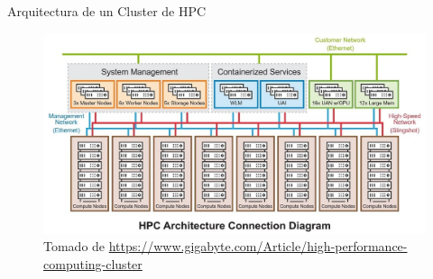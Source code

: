 \documentclass[11pt]{beamer}
\begin{document}
\begin{frame}{Arquitectura de un Cluster de HPC}
	\vspace{-0.5cm}
	\begin{figure}
		\includegraphics[scale=0.42]{images/hpc_cluster}
		\caption{Tomado de \url{https://www.gigabyte.com/Article/high-performance-computing-cluster}}
	\end{figure}
\end{frame}
\end{document}
